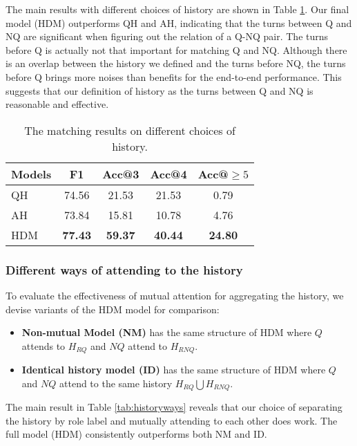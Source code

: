The main results with different choices of history are shown in 
Table \ref{tab:historychoice}.
Our final model (HDM) outperforms QH and AH, indicating that the turns between Q and NQ are significant when figuring out the relation of a Q-NQ pair. The turns before Q is actually not that important for matching Q and NQ. 
Although there is an overlap between the history we defined and 
the turns before NQ, 
the turns before Q brings more noises than benefits for
the end-to-end performance. This suggests that our definition of 
history as the turns between Q and NQ is reasonable and effective.

\begin{table}
	
	\centering
	\begin{tabular}{p{1.5cm}<{\centering}|c|ccc}
		\toprule[1.3pt]
		Models &F1&Acc@3&Acc@4&Acc@$\geq5$\\
		\midrule[1pt]
		QH&74.56&21.53&21.53&0.79 \\	
		AH&73.84&15.81&10.78&4.76 \\
		HDM&\textbf{77.43}&\textbf{59.37}&\textbf{40.44}&\textbf{24.80}\\
		\bottomrule[1.3pt]
	\end{tabular}
	\vspace{-0.25cm}
	\caption{The matching results on different choices of history.}
	\label{tab:historychoice}
\end{table}

\subsubsection{Different ways of attending to the history}

To evaluate the effectiveness of mutual attention for aggregating the 
history, we devise variants of the HDM model for comparison:
\begin{itemize}
	\item \textbf{Non-mutual Model (NM)} has the same structure of HDM 
	where $Q$ attends to $H_{RQ}$ and $NQ$ attend to $H_{RNQ}$.
	\item \textbf{Identical history model (ID)} has the same structure of HDM where $Q$ and $NQ$ attend to the same history $H_{RQ}\bigcup H_{RNQ}$.

\end{itemize}

The main result in Table \ref{tab:historyways} reveals that our choice 
of separating the history by role label and mutually attending to each other
does work. The full model (HDM) consistently outperforms both NM and ID. 



